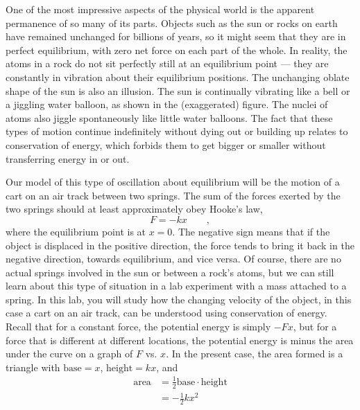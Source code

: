 \label{lab:conservation-of-energy}


\apparatus
{}



\introduction

One of the most impressive aspects of the physical world is
the apparent permanence of so many of its parts.  Objects
such as the sun or rocks on earth have remained unchanged
for billions of years, so it might seem that they are in
perfect equilibrium, with zero net force on each part of the
whole.  In reality, the atoms in a rock do not sit perfectly
still at an equilibrium point --- they are constantly in
vibration about their equilibrium positions.  The unchanging
oblate shape of the sun is also an illusion.  The sun is
continually vibrating like a bell or a jiggling water
balloon, as shown in the (exaggerated) figure.  The nuclei
of atoms also jiggle spontaneously like little water
balloons. The fact that these types of motion continue
indefinitely without dying out or building up relates to
conservation of energy, which forbids them to get bigger or
smaller without transferring energy in or out.






Our model of this type of oscillation about equilibrium will
be the motion of a cart on an air track between two springs.
 The sum of the forces exerted by the two springs should at
least approximately obey Hooke's law,
\begin{equation*}
	F  = -kx   \qquad   ,
\end{equation*}
where the equilibrium point is at $x=0$.  The negative sign
means that if the object is displaced in the positive
direction, the force tends to bring it back in the negative
direction, towards equilibrium, and vice versa.  Of course,
there are no actual springs involved in the sun or between a
rock's atoms, but we can still learn about this type of
situation in a lab experiment with a mass attached to a
spring.  In this lab, you will study how the changing
velocity of the object, in this case a cart on an air track,
can be understood using conservation of energy.  Recall that
for a constant force, the potential energy is simply
$-Fx$, but for a force that is different at different
locations, the potential energy is minus the area under the
curve on a graph of $F$ vs. $x$.  In the present case, the
area formed is a triangle with $\text{base}=x$, $\text{height}=kx$, and
\begin{align*}
   \text{area}     &=  \frac{1}{2}\text{base}\cdot\text{height}  \\
       &=     -\frac{1}{2}kx^2
\end{align*}

